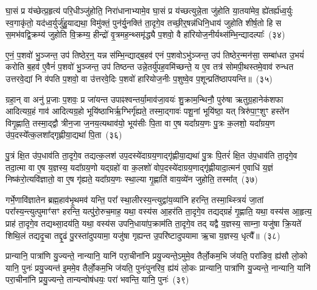 घा॒सं प्र य॑च्छेत्प्र॒हृत्य॑ परि॒धीञ्जु॑होति॒ निरा॑धानाभ्यामे॒व घा॒सं प्र य॑च्छत्युन्ने॒ता जु॑होति या॒तया॑मेव॒ ह्ये॑तर्\mbox{}ह्य॑ध्व॒र्युः स्व॒गाकृ॑तो॒ यद॑ध्व॒र्युर्जु॑हु॒याद्यथा॒ विमु॑क्तं॒ पुन॑र्यु॒नक्ति॑ ता॒दृगे॒व तच्छी॒र्॒\mbox{}षन्न॑धिनि॒धाय॑ जुहोति शीर्\mbox{}ष॒तो हि स स॒मभ॑वद्वि॒क्रम्य॑ जुहोति वि॒क्रम्य॒ हीन्द्रो॑ वृ॒त्रमह॒न्थ्समृ॑द्ध्यै प॒शवो॒ वै हा॑रियोज॒नीर्यथ्स॑म्भि॒न्द्यादल्पाः᳚~(३४)\ip

ए॒नं॒ प॒शवो॑ भु॒ञ्जन्त॒ उप॑ तिष्ठेर॒न्॒ यन्न स॑म्भि॒न्द्याद्ब॒हव॑ एनं प॒शवो\-ऽभु॑ञ्जन्त॒ उप॑ तिष्ठेर॒न्मन॑सा॒ सम्बा॑धत उ॒भयं॑ करोति ब॒हव॑ ए॒वैनं॑ प॒शवो॑ भु॒ञ्जन्त॒ उप॑ तिष्ठन्त उन्ने॒तर्यु॑पह॒वमि॑च्छन्ते॒ य ए॒व तत्र॑ सोमपी॒थस्तमे॒वाव॑ रुन्धत उत्तरवे॒द्यां नि व॑पति प॒शवो॒ वा उ॑त्तरवे॒दिः प॒शवो॑ हारियोज॒नीः प॒शुष्वे॒व प॒शून्प्रति॑\-ष्ठापयन्ति॥~(३५)\ip

{\anuvakamend[{अ॒श्री॒णा॒द॒न्तरा॑धानाभ्या॒मल्पाः᳚ स्थापयन्ति}]}

ग्रहा॒न् वा अनु॑ प्र॒जाः प॒शवः॒ प्र जा॑यन्त उपाꣴश्वन्तर्या॒माव॑जा॒वयः॑ शु॒क्राम॒न्थिनौ॒ पुरु॑षा ऋतुग्र॒हानेक॑शफा आदित्यग्र॒हं गाव॑ आदित्यग्र॒हो भूयि॑ष्ठाभिर्\mbox{}ऋ॒ग्भिर्गृ॑ह्यते॒ तस्मा॒द्गावः॑ पशू॒नां भूयि॑ष्ठा॒ यत् त्रिरु॑पा॒ꣳ॒शुꣳ हस्ते॑न विगृ॒ह्णाति॒ तस्मा॒द्द्वौ त्रीन॒जा ज॒नय॒त्यथाव॑यो॒ भूय॑सीः पि॒ता वा ए॒ष यदा᳚ग्रय॒णः पु॒त्रः क॒लशो॒ यदा᳚ग्रय॒ण उ॑प॒दस्ये᳚त्क॒लशा᳚द्गृह्णीया॒द्यथा॑ पि॒ता~(३६)\ip

पु॒त्रं क्षि॒त उ॑प॒धाव॑ति ता॒दृगे॒व तद्यत्क॒लश॑ उप॒दस्ये॑दाग्रय॒णाद्गृ॑ह्णीया॒द्यथा॑ पु॒त्रः पि॒तरं॑ क्षि॒त उ॑प॒धाव॑ति ता॒दृगे॒व तदा॒त्मा वा ए॒ष य॒ज्ञस्य॒ यदा᳚ग्रय॒णो यद्ग्रहो॑ वा क॒लशो॑ वोप॒दस्ये॑दाग्रय॒णाद्गृ॑ह्णीयादा॒त्मन॑ ए॒वाधि॑ य॒ज्ञं निष्क॑रो॒त्यवि॑ज्ञातो॒ वा ए॒ष गृ॑ह्यते॒ यदा᳚ग्रय॒णः स्था॒ल्या गृ॒ह्णाति॑ वाय॒व्ये॑न जुहोति॒ तस्मा᳚त्~(३७)\ip

गर्भे॒णावि॑ज्ञातेन ब्रह्म॒हाव॑भृ॒थमव॑ यन्ति॒ परा᳚ स्था॒लीरस्य॒न्त्युद्वा॑य॒व्या॑नि हरन्ति॒ तस्मा॒थ्स्त्रियं॑ जा॒तां परा᳚स्य॒न्त्यु\-त्पुमाꣳ॑सꣳ हरन्ति॒ यत्पु॑रो॒रुच॒माह॒ यथा॒ वस्य॑स आ॒हर॑ति ता॒दृगे॒व तद्यद्ग्रहं॑ गृ॒ह्णाति॒ यथा॒ वस्य॑स आ॒हृत्य॒ प्राह॑ ता॒दृगे॒व तद्यथ्सा॒दय॑ति॒ यथा॒ वस्य॑स उपनि॒धाया॑प॒क्राम॑ति ता॒दृगे॒व तद् यद्वै य॒ज्ञस्य॒ साम्ना॒ यजु॑षा क्रि॒यते॑ शिथि॒लं तद्यदृ॒चा तद्दृ॒ढं पु॒रस्ता॑दुपयामा॒ यजु॑षा गृह्यन्त उ॒परि॑ष्टादुपयामा ऋ॒चा य॒ज्ञस्य॒ धृत्यै᳚॥~(३८)\ip

{\anuvakamend[{यथा॑ पि॒ता तस्मा॑दप॒क्राम॑ति ता॒दृगे॒व तद्यद॒ष्टाद॑श च}]}%

प्रान्यानि॒ पात्रा॑णि यु॒ज्यन्ते॒ नान्यानि॒ यानि॑ परा॒चीना॑नि प्रयु॒ज्यन्ते॒\-ऽमुमे॒व तैर्लो॒कम॒भि ज॑यति॒ परा॑ङिव॒ ह्य॑सौ लो॒को यानि॒ पुनः॑ प्रयु॒ज्यन्त॑ इ॒ममे॒व तैर्लो॒कम॒भि ज॑यति॒ पुनः॑पुनरिव॒ ह्य॑यं लो॒कः प्रान्यानि॒ पात्रा॑णि यु॒ज्यन्ते॒ नान्यानि॒ यानि॑ परा॒चीना॑नि प्रयु॒ज्यन्ते॒ तान्यन्वोष॑धयः॒ परा॑ भवन्ति॒ यानि॒ पुनः॑~(३९)\ip

